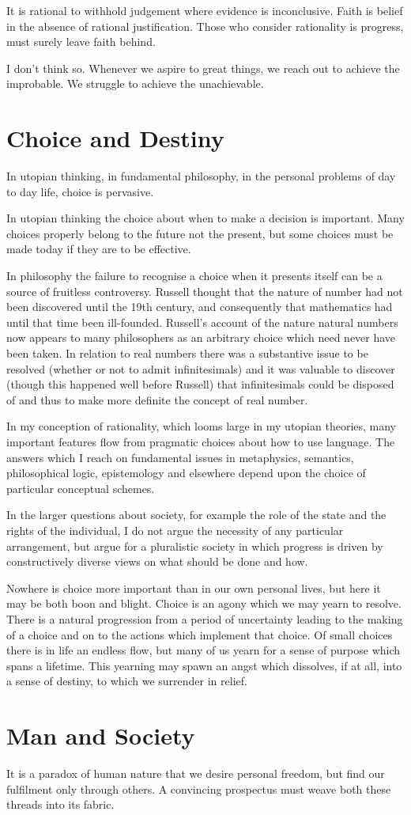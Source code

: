 It is rational to withhold judgement where evidence is inconclusive.
Faith is belief in the absence of rational justification.
Those who consider rationality is progress, must surely leave faith behind.

I don't think so.
Whenever we aspire to great things, we reach out to achieve the improbable.
We struggle to achieve the unachievable.

\section{Choice and Destiny}

In utopian thinking, in fundamental philosophy, in the personal problems of day to day life, choice is pervasive.

In utopian thinking the choice about when to make a decision is important.
Many choices properly belong to the future not the present, but some choices must be made today if they are to be effective.

In philosophy the failure to recognise a choice when it presents itself can be a source of fruitless controversy.
Russell thought that the nature of number had not been discovered until the 19th century, and consequently that mathematics had until that time been ill-founded.
Russell's account of the nature natural numbers now appears to many philosophers as an arbitrary choice which need never have been taken.
In relation to real numbers there was a substantive issue to be resolved (whether or not to admit infinitesimals) and it was valuable to discover (though this happened well before Russell) that infinitesimals could be disposed of and thus to make more definite the concept of real number.

In my conception of rationality, which looms large in my utopian theories, many important features flow from pragmatic choices about how to use language.
The answers which I reach on fundamental issues in metaphysics, semantics, philosophical logic, epistemology and elsewhere depend upon the choice of particular conceptual schemes.

In the larger questions about society, for example the role of the state and the rights of the individual, I do not argue the necessity of any particular arrangement, but argue for a pluralistic society in which progress is driven by constructively diverse views on what should be done and how.

Nowhere is choice more important than in our own personal lives, but here it may be both boon and blight.
Choice is an agony which we may yearn to resolve.
There is a natural progression from a period of uncertainty leading to the making of a choice and on to the actions which implement that choice.
Of small choices there is in life an endless flow, but many of us yearn for a sense of purpose which spans a lifetime.
This yearning may spawn an angst which dissolves, if at all, into a sense of destiny, to which we surrender in relief.

\section{Man and Society}

It is a paradox of human nature that we desire personal freedom, but find our fulfilment only through others.
A convincing prospectus must weave both these threads into its fabric.